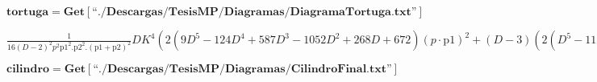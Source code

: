 \documentclass{article}
\begin{document}
\begin{doublespace}
\noindent\(\pmb{\text{tortuga} = \text{Get}[\text{{``}./Descargas/TesisMP/Diagramas/DiagramaTortuga.txt{''}}]}\)
\end{doublespace}

\begin{doublespace}
\noindent\(\frac{1}{16 (D-2)^2 p^2 \text{p1}^2.\text{p2}^2.(\text{p1}+\text{p2})^2}D K^4 \left(2 \left(9 D^5-124 D^4+587 D^3-1052 D^2+268 D+672\right)
(p\cdot \text{p1})^2+(D-3) \left(2 \left(D^5-11 D^4-84 D^3+540 D^2-232 D-688\right) (\text{p1}\cdot \text{p2})^2+\text{p1}^2 \left(2 \left(2 D^5-35
D^4+81 D^3+92 D^2+4 D-144\right) (\text{p1}\cdot \text{p2})+\left(4 D^5-83 D^4+411 D^3-804 D^2+476 D+944\right) \text{p2}^2\right)+2 \left(2 D^5-35
D^4+81 D^3+92 D^2+4 D-144\right) \text{p2}^2 (\text{p1}\cdot \text{p2})+\left(2 D^5-35 D^4+81 D^3+92 D^2+4 D-144\right) \text{p1}^4+\left(2 D^5-35
D^4+81 D^3+92 D^2+4 D-144\right) \text{p2}^4\right)+2 \left(9 D^5-124 D^4+587 D^3-1052 D^2+268 D+672\right) (p\cdot \text{p2}) (p\cdot \text{p1}+p\cdot
\text{p2})+\left(2 D^6-51 D^5+364 D^4-1131 D^3+1628 D^2-636 D-896\right) p^2 \left(\text{p1}\cdot \text{p2}+\text{p1}^2+\text{p2}^2\right)\right)\)
\end{doublespace}

\begin{doublespace}
\noindent\(\pmb{\text{cilindro} = \text{Get}[\text{{``}./Descargas/TesisMP/Diagramas/CilindroFinal.txt{''}}]}\)
\end{doublespace}
\end{document}
